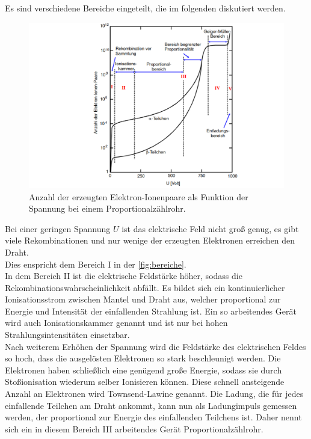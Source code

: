 Es sind verschiedene Bereiche eingeteilt, die im folgenden diskutiert werden.
\begin{figure}
    \centering
    \includegraphics[width=\textwidth]{content/bereiche.pdf}
    \caption{Anzahl der erzeugten Elektron-Ionenpaare als Funktion der Spannung bei einem Proportionalzählrohr. \cite{anleitung}}
    \label{fig:bereiche}
\end{figure}
Bei einer geringen Spannung $U$ ist das elektrische Feld nicht groß genug, es gibt viele Rekombinationen und nur wenige der erzeugten Elektronen erreichen den Draht.\\
Dies enspricht dem Bereich I in der \autoref{fig:bereiche}.\\
In dem Bereich II ist die elektrische Feldstärke höher, sodass die Rekombinationswahrscheinlichkeit abfällt. 
Es bildet sich ein kontinuierlicher Ionisationsstrom zwischen Mantel und Draht aus, welcher proportional zur Energie und Intensität der einfallenden Strahlung ist. 
Ein so arbeitendes Gerät wird auch Ionisationskammer genannt und ist nur bei hohen Strahlungsintensitäten einsetzbar.\\
Nach weiterem Erhöhen der Spannung wird die Feldstärke des elektrischen Feldes so hoch, dass die ausgelösten Elektronen so stark beschleunigt werden. 
Die Elektronen haben schließlich eine genügend große Energie, sodass sie durch Stoßionisation wiederum selber Ionisieren können.
Diese schnell ansteigende Anzahl an Elektronen wird Townsend-Lawine genannt. 
Die Ladung, die für jedes einfallende Teilchen am Draht ankommt, kann nun als Ladungimpuls gemessen werden, der proportional zur Energie des einfallenden Teilchens ist.
Daher nennt sich ein in diesem Bereich III arbeitendes Gerät Proportionalzählrohr.\\

